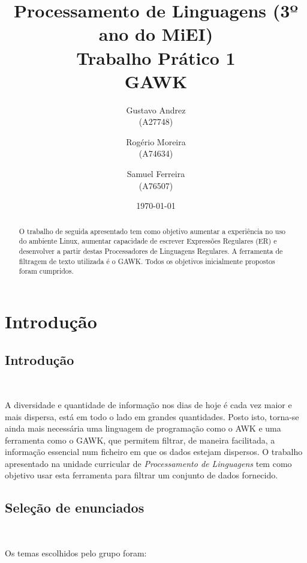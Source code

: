 \documentclass{report}
\title{Processamento de Linguagens (3º ano do MiEI)\\ \textbf{Trabalho Prático 1}\\ GAWK}
\author{Gustavo Andrez\\ (A27748) \and Rogério Moreira\\ (A74634) \and Samuel Ferreira\\ (A76507) }
\date{\today}
\def\pl{\emph{Processamento de Linguagens}\xspace}
\begin{document}
\maketitle

\begin{abstract}

O trabalho de seguida apresentado tem como objetivo aumentar a experiência no uso do ambiente Linux, aumentar capacidade de escrever Express\~oes Regulares (ER) e desenvolver a partir destas Processadores de Linguagens Regulares. A ferramenta de filtragem de texto utilizada é o GAWK. Todos os objetivos inicialmente propostos foram cumpridos.

\end{abstract}

\tableofcontents

\chapter{Introdu\c{c}\~ao} \label{intro}

\section*{Introdu\c{c}\~ao} \

A diversidade e quantidade de informa\c{c}\~ao nos dias de hoje é cada vez maior e mais dispersa, está em todo o lado em grandes quantidades. Posto isto, torna-se ainda mais necessária uma linguagem de programa\c{c}\~ao como o AWK e uma ferramenta como o GAWK, que permitem filtrar, de maneira facilitada, a informa\c{c}\~ao essencial num ficheiro em que os dados estejam dispersos. O trabalho apresentado na unidade curricular de \pl tem como objetivo usar esta ferramenta para filtrar um conjunto de dados fornecido.


\section*{Sele\c{c}\~ao de enunciados} \

Os temas escolhidos pelo grupo foram:
\end{document}
